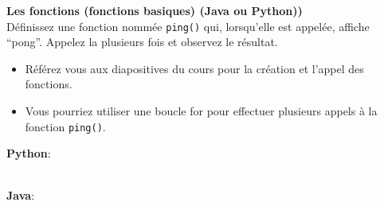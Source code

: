\begin{Exercice}[5 minutes] \textbf{Les fonctions (fonctions basiques) (Java ou Python))}\\
  Définissez une fonction nommée \lstinline{ping()} qui, lorsqu'elle est appelée, affiche ``pong''. Appelez la plusieurs fois et observez le résultat.  \\
   
    \begin{conseil}
        \begin{itemize}
            \item Référez vous aux diapositives du cours pour la création et l'appel des fonctions. 
            \item Vous pourriez utiliser une boucle for pour effectuer plusieurs appels à la fonction \lstinline{ping()}.
        \end{itemize}        
    \end{conseil}
    \begin{solution}
    
        \textbf{Python}:
        
        
        \textbf{\\Java}:
        
           
    \end{solution}   
\end{Exercice}

